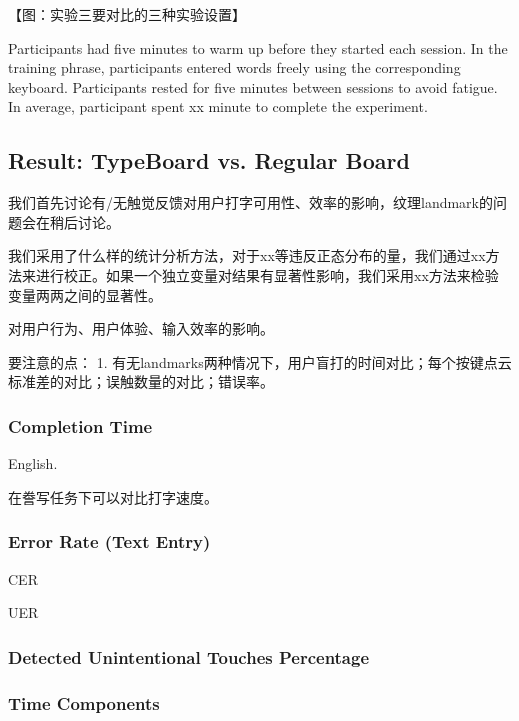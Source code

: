 【图：实验三要对比的三种实验设置】

Participants had five minutes to warm up before they started each session. In the training phrase, participants entered words freely using the corresponding keyboard. Participants rested for five minutes between sessions to avoid fatigue. In average, participant spent xx minute to complete the experiment.


\subsection{Result: TypeBoard vs. Regular Board}

我们首先讨论有/无触觉反馈对用户打字可用性、效率的影响，纹理landmark的问题会在稍后讨论。

我们采用了什么样的统计分析方法，对于xx等违反正态分布的量，我们通过xx方法来进行校正。如果一个独立变量对结果有显著性影响，我们采用xx方法来检验变量两两之间的显著性。

对用户行为、用户体验、输入效率的影响。

要注意的点：
1. 有无landmarks两种情况下，用户盲打的时间对比；每个按键点云标准差的对比；误触数量的对比；错误率。

\subsubsection{Completion Time}

English.

在誊写任务下可以对比打字速度。

\subsubsection{Error Rate (Text Entry)}

CER

UER

\subsubsection{Detected Unintentional Touches Percentage}

\subsubsection{Time Components}

